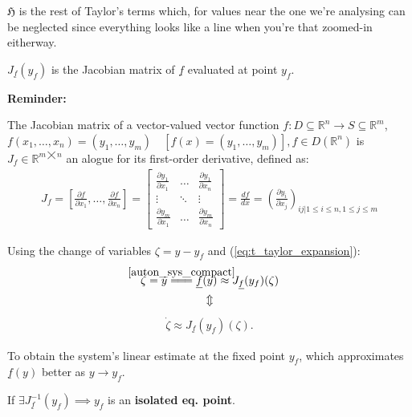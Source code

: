 $\mathfrak{H}$ is the rest of Taylor's terms which, for values near the one we're analysing can be neglected since everything looks like a line when you're that zoomed-in eitherway.

$J_{\underline{f}}(y_f)$ is the Jacobian matrix of $\underline{f}$ evaluated at point $y_f$.

\textbf{Reminder:}
\begin{definition}
The Jacobian matrix of a vector-valued vector function $f : D \subseteq \mathbb{R}^n \rightarrow S \subseteq \mathbb{R}^m$, $f(x_1, \dots, x_n) = (y_1, \dots , y_m) \quad [f(x) = (y_1, \dots , y_m)], f \in D(\mathbb{R}^n)$ is $J_f \in \mathbb{R}^{m \bigtimes n}$ an alogue for its first-order derivative, defined as:
\begin{align*}
  J_f = \left[ \frac{\partial f}{\partial x_1}, \dots , \frac{\partial f}{\partial x_n}  \right] =
  \begin{bmatrix*}
    \frac{\partial y_1}{\partial x_1} & \dots & \frac{\partial y_1}{\partial x_n} \\
    \vdots & \ddots & \vdots \\
    \frac{\partial y_m}{\partial x_1} & \dots &  \frac{\partial y_m}{\partial x_n}
  \end{bmatrix*} =
  \frac{df}{dx} =
  \left(   \frac{\partial y_i}{\partial x_j} \right)_{ij | 1 \leqslant i \leqslant n, 1 \leqslant j \leqslant m}
\end{align*}
\end{definition}

\newcommand\eqCuzOfSys{\stackrel{\mathclap{\normalfont\mbox{\ref{auton_sys_compact}}}}{=\joinrel=\joinrel=}}

Using the change of variables $\zeta = y - y_f$ and (\ref{eq:t_taylor_expansion}):
\begin{gather*}
\dot{\zeta} = \dot{y} \eqCuzOfSys \underline{f}(y) \approx J_{\underline{f}}(y_f)(\zeta) \\
\Updownarrow
\end{gather*}
\vspace*{-16mm}
\begin{gather}\label{eq:lin_approx}
\dot{\zeta} \approx J_{\underline{f}}(y_f)(\zeta). \tag{Lin. Approx.}
\end{gather}

To obtain the system's linear estimate at the fixed point $y_f$, which approximates $\underline{f}(y)$ better as $y \rightarrow y_f$.

\begin{theorem}
If $\exists J_{\underline{f}}^{-1}(y_f) \implies y_f$ is an \textbf{isolated eq. point}.
\end{theorem}

